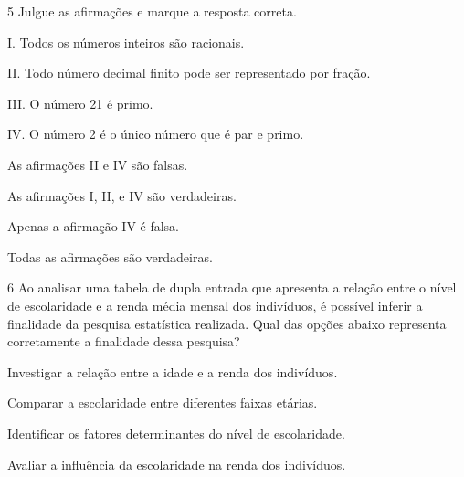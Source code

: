 

\num{5} Julgue as afirmações e marque a resposta correta.

I. Todos os números inteiros são racionais.

II. Todo número decimal finito pode ser representado por fração.

III. O número 21 é primo.

IV. O número 2 é o único número que é par e primo.

\begin{escolha}
\item
  As afirmações II e IV são falsas.
\item
  As afirmações I, II, e IV são verdadeiras.
\item
  Apenas a afirmação IV é falsa.
\item
  Todas as afirmações são verdadeiras.
\end{escolha}






\num{6} Ao analisar uma tabela de dupla entrada que apresenta a relação entre
o nível de escolaridade e a renda média mensal dos indivíduos, é
possível inferir a finalidade da pesquisa estatística realizada. Qual
das opções abaixo representa corretamente a finalidade dessa pesquisa?

\begin{escolha}
\item Investigar a relação entre a idade e a renda dos indivíduos.
\item Comparar a escolaridade entre diferentes faixas etárias.
\item Identificar os fatores determinantes do nível de escolaridade.
\item Avaliar a influência da escolaridade na renda dos indivíduos.
\end{escolha}

